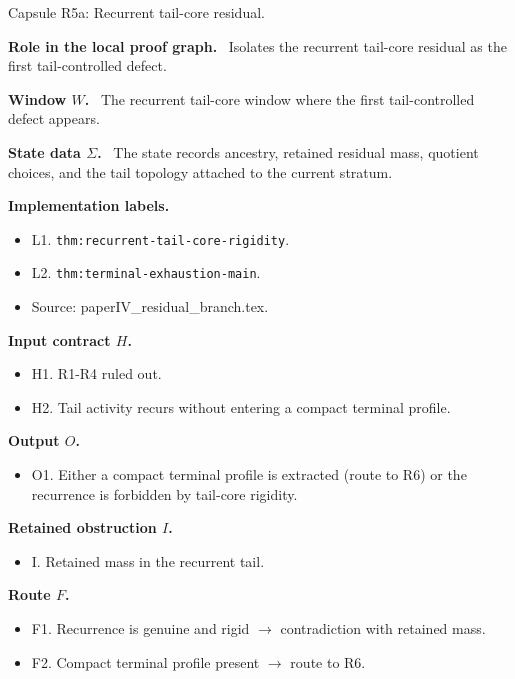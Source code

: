 \documentclass[11pt]{amsart}
\newcommand{\capsulefield}[1]{\par\smallskip\noindent\textbf{#1.}\ }
\begin{document}
\begin{proofcapsule}{Capsule R5a: Recurrent tail-core residual.}
  \capsulefield{Role in the local proof graph}
  Isolates the recurrent tail-core residual as the first tail-controlled defect.

  \capsulefield{Window \(W\)}
The recurrent tail-core window where the first tail-controlled defect appears.

  \capsulefield{State data \(\Sigma\)}
The state records ancestry, retained residual mass, quotient choices, and the tail topology attached to the current stratum.

  \capsulefield{Implementation labels}
  \begin{itemize}[leftmargin=1.8em]
  \item L1. \texttt{thm:recurrent-tail-core-rigidity}.
  \item L2. \texttt{thm:terminal-exhaustion-main}.
  \item Source: paperIV\_residual\_branch.tex.
  \end{itemize}

  \capsulefield{Input contract \(H\)}
  \begin{itemize}[leftmargin=1.8em]
  \item H1. R1-R4 ruled out.
  \item H2. Tail activity recurs without entering a compact terminal profile.
  \end{itemize}

  \capsulefield{Output \(O\)}
  \begin{itemize}[leftmargin=1.8em]
  \item O1. Either a compact terminal profile is extracted (route to R6) or the recurrence is forbidden by tail-core rigidity.
  \end{itemize}

  \capsulefield{Retained obstruction \(I\)}
  \begin{itemize}[leftmargin=1.8em]
  \item I. Retained mass in the recurrent tail.
  \end{itemize}

  \capsulefield{Route \(F\)}
  \begin{itemize}[leftmargin=1.8em]
  \item F1. Recurrence is genuine and rigid $\to$ contradiction with retained mass.
  \item F2. Compact terminal profile present $\to$ route to R6.
  \end{itemize}


\end{proofcapsule}
\end{document}
